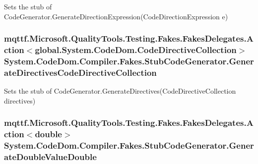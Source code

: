 Sets the stub of Code\-Generator.\-Generate\-Direction\-Expression(\-Code\-Direction\-Expression e)

\hypertarget{class_system_1_1_code_dom_1_1_compiler_1_1_fakes_1_1_stub_code_generator_a2529d061e7d1e8a8ceb52e72aedee474}{
\subsubsection[{Generate\-Directives\-Code\-Directive\-Collection}]{\setlength{\rightskip}{0pt plus 5cm}mqttf.\-Microsoft.\-Quality\-Tools.\-Testing.\-Fakes.\-Fakes\-Delegates.\-Action$<$global.\-System.\-Code\-Dom.\-Code\-Directive\-Collection$>$ System.\-Code\-Dom.\-Compiler.\-Fakes.\-Stub\-Code\-Generator.\-Generate\-Directives\-Code\-Directive\-Collection}}\label{class_system_1_1_code_dom_1_1_compiler_1_1_fakes_1_1_stub_code_generator_a2529d061e7d1e8a8ceb52e72aedee474}


Sets the stub of Code\-Generator.\-Generate\-Directives(\-Code\-Directive\-Collection directives)

\hypertarget{class_system_1_1_code_dom_1_1_compiler_1_1_fakes_1_1_stub_code_generator_a7b6d2683016aaf06445674e070a66536}{
\subsubsection[{Generate\-Double\-Value\-Double}]{\setlength{\rightskip}{0pt plus 5cm}mqttf.\-Microsoft.\-Quality\-Tools.\-Testing.\-Fakes.\-Fakes\-Delegates.\-Action$<$double$>$ System.\-Code\-Dom.\-Compiler.\-Fakes.\-Stub\-Code\-Generator.\-Generate\-Double\-Value\-Double}}\label{class_system_1_1_code_dom_1_1_compiler_1_1_fakes_1_1_stub_code_generator_a7b6d2683016aaf06445674e070a66536}


